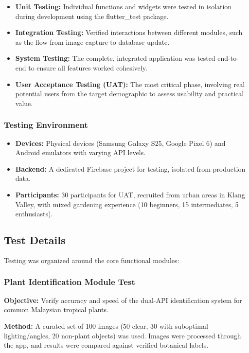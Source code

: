 \documentclass[conference]{IEEEtran}
\begin{document}
\begin{itemize}
    \item \textbf{Unit Testing:} Individual functions and widgets were tested in isolation during development using the flutter\_test package.
    \item \textbf{Integration Testing:} Verified interactions between different modules, such as the flow from image capture to database update.
    \item \textbf{System Testing:} The complete, integrated application was tested end-to-end to ensure all features worked cohesively.
    \item \textbf{User Acceptance Testing (UAT):} The most critical phase, involving real potential users from the target demographic to assess usability and practical value.
\end{itemize}

\subsubsection{Testing Environment}
\begin{itemize}
    \item \textbf{Devices:} Physical devices (Samsung Galaxy S25, Google Pixel 6) and Android emulators with varying API levels.
    \item \textbf{Backend:} A dedicated Firebase project for testing, isolated from production data.
    \item \textbf{Participants:} 30 participants for UAT, recruited from urban areas in Klang Valley, with mixed gardening experience (10 beginners, 15 intermediates, 5 enthusiasts).
\end{itemize}

\subsection{Test Details}
Testing was organized around the core functional modules:

\subsubsection{Plant Identification Module Test}
\textbf{Objective:} Verify accuracy and speed of the dual-API identification system for common Malaysian tropical plants.

\textbf{Method:} A curated set of 100 images (50 clear, 30 with suboptimal lighting/angles, 20 non-plant objects) was used. Images were processed through the app, and results were compared against verified botanical labels.
\end{document}
